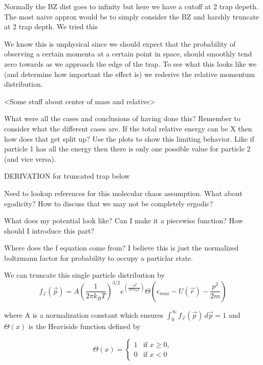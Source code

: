 Normally the BZ dist goes to infinity but here we have a cutoff at 2 trap depeth. The most naive approx would be to simply consider the BZ and harshly truncate at 2 trap depth. We tried this

We know this is unphysical since we should expect that the probability of observing a certain momenta at a certain point in space, should smoothly tend zero towards as we approach the edge of the trap. To see what this looks like we (and determine how important the effect is) we rederive the relative momentum distribution.

<Some stuff about center of mass and relative>

What were all the cases and conclusions of having done this? Remember to consider what the different cases are. If the total relative energy can be X then how does that get split up? Use the plots to show this limiting behavior. Like if particle 1 has all the energy then there is only one possible value for particle 2 (and vice versa).


DERIVATION for truncated trap below

Need to lookup references for this molecular chaos assumption. What about egodicity? How to discuss that we may not be completely ergodic?

What does my potential look like? Can I make it a piecewise function? How should I introduce this part?

Where does the f equation come from? I believe this is just the normalized boltzmann factor for probability to occupy a particlar state.

\noindent
We can truncate this single particle distribution by 
\begin{equation}
\label{eq:trun_single_particle_prob}
		 f_{ \vec{r} }( \vec{p} ) = A \left(\frac{1}{2 \pi k_B T}\right)^{3/2} e^{\left(\frac{-p^2}{2 m k_B T}\right)} \Theta \left( \epsilon_{max} - U( \vec{r} ) - \frac{p^2}{2 m} \right)
\end{equation}

\noindent
where A is a normalization constant which ensures $\int_0^\infty f_{ \vec{r} }( \vec{p} )\,d \vec{p} = 1 $ and $\Theta(x)$ is the Heaviside function defined by

\begin{equation}
\label{eq:heaviside}
	\Theta(x)=
	\begin{cases}
		1 &\text{if } x \geq 0, \\
		0 &\text{if } x < 0
	\end{cases}
\end{equation}

